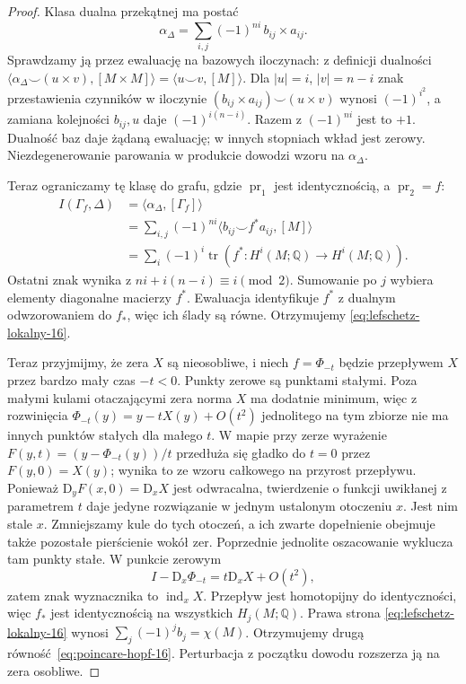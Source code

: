 \documentclass[11pt,a4paper,oneside]{report}
\newcommand{\Q}{\mathbb{Q}}
\newcommand{\pr}{\operatorname{pr}}
\newcommand{\D}{\mathrm D}
\theoremstyle{plain}
\theoremstyle{definition}
\theoremstyle{remark}
\begin{document}
\begin{proof}
Klasa dualna przekątnej ma postać
\[
 \alpha_\Delta=\sum_{i,j}(-1)^{ni}\,b_{ij}\times a_{ij}.
\]
Sprawdzamy ją przez ewaluację na bazowych iloczynach:
z definicji dualności
$\langle\alpha_\Delta\smile(u\times v),[M\times M]\rangle
=\langle u\smile v,[M]\rangle$.
Dla $|u|=i$, $|v|=n-i$ znak przestawienia czynników
w iloczynie $(b_{ij}\times a_{ij})\smile(u\times v)$
wynosi $(-1)^{i^2}$, a zamiana kolejności $b_{ij},u$
daje $(-1)^{i(n-i)}$. Razem z $(-1)^{ni}$ jest to
$+1$. Dualność baz daje żądaną ewaluację; w innych
stopniach wkład jest zerowy. Niezdegenerowanie
parowania w produkcie dowodzi wzoru na $\alpha_\Delta$.

Teraz ograniczamy tę klasę do grafu, gdzie
$\pr_1$ jest identycznością, a $\pr_2=f$:
\begin{align*}
 I(\Gamma_f,\Delta)
 &=\langle\alpha_\Delta,[\Gamma_f]\rangle\\
 &=\sum_{i,j}(-1)^{ni}
       \langle b_{ij}\smile f^*a_{ij},[M]\rangle\\
 &=\sum_i(-1)^i\operatorname{tr}
       (f^*:H^i(M;\Q)\to H^i(M;\Q)).
\end{align*}
Ostatni znak wynika z
$ni+i(n-i)\equiv i\pmod2$. Sumowanie po $j$
wybiera elementy diagonalne macierzy $f^*$.
Ewaluacja identyfikuje $f^*$ z dualnym odwzorowaniem
do $f_*$, więc ich ślady są równe. Otrzymujemy
\eqref{eq:lefschetz-lokalny-16}.

Teraz przyjmijmy, że
zera $X$ są nieosobliwe,
i niech $f=\Phi_{-t}$
będzie przepływem
$X$ przez bardzo
mały czas $-t<0$.
Punkty zerowe są
punktami stałymi.
Poza małymi kulami
otaczającymi zera
norma $X$ ma
dodatnie minimum,
więc z rozwinięcia
$\Phi_{-t}(y)=y-tX(y)+O(t^2)$
jednolitego na tym
zbiorze nie ma
innych punktów
stałych dla małego $t$.
W mapie przy zerze wyrażenie
$F(y,t)=(y-\Phi_{-t}(y))/t$ przedłuża się gładko
do $t=0$ przez $F(y,0)=X(y)$; wynika to ze wzoru
całkowego na przyrost przepływu. Ponieważ
$\D_yF(x,0)=\D_xX$ jest odwracalna, twierdzenie
o funkcji uwikłanej z parametrem $t$ daje jedyne
rozwiązanie w jednym ustalonym otoczeniu $x$.
Jest nim stale $x$. Zmniejszamy kule do tych
otoczeń, a ich zwarte dopełnienie obejmuje także
pozostałe pierścienie wokół zer. Poprzednie
jednolite oszacowanie wyklucza tam punkty stałe.
W punkcie zerowym
\[
 I-\D_x\Phi_{-t}
   =t\D_xX+O(t^2),
\]
zatem znak wyznacznika
to $\operatorname{ind}_xX$.
Przepływ jest
homotopijny do
identyczności,
więc $f_*$ jest
identycznością
na wszystkich
$H_j(M;\Q)$.
Prawa strona
\eqref{eq:lefschetz-lokalny-16}
wynosi
$\sum_j(-1)^j b_j=\chi(M)$.
Otrzymujemy drugą
równość~\eqref{eq:poincare-hopf-16}.
Perturbacja z początku
dowodu rozszerza ją
na zera osobliwe.
\end{proof}
\end{document}
